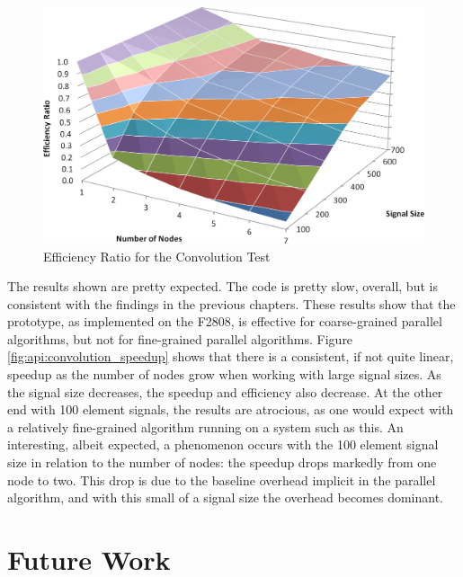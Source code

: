 \begin{landscape}
	\begin{figure}[p]
		\begin{centering}
			\includegraphics[width=8.5in]{API/Figures/api-convolution_efficiency.png}
			\caption{Efficiency Ratio for the Convolution Test}
			\label{fig:api:convolution_efficiency}
		\end{centering}
	\end{figure}
\end{landscape}

The results shown are pretty expected. The code is pretty slow, overall, but is consistent with the findings in the previous chapters. These results show that the prototype, as implemented on the F2808, is effective for coarse-grained parallel algorithms, but not for fine-grained parallel algorithms. Figure \ref{fig:api:convolution_speedup} shows that there is a consistent, if not quite linear, speedup as the number of nodes grow when working with large signal sizes. As the signal size decreases, the speedup and efficiency also decrease. At the other end with 100 element signals, the results are atrocious, as one would expect with a relatively fine-grained algorithm running on a system such as this. An interesting, albeit expected, a phenomenon occurs with the 100 element signal size in relation to the number of nodes: the speedup drops markedly from one node to two. This drop is due to the baseline overhead implicit in the parallel algorithm, and with this small of a signal size the overhead becomes dominant.

\section{Future Work}\label{sec:api:future_work}

